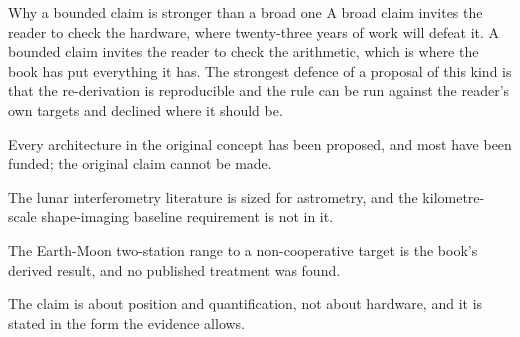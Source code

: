 \begin{seamnote}{Why a bounded claim is stronger than a broad one}
A broad claim invites the reader to check the hardware, where twenty-three
years of work will defeat it. A bounded claim invites the reader to check
the arithmetic, which is where the book has put everything it has. The
strongest defence of a proposal of this kind is that the re-derivation is
reproducible and the rule can be run against the reader's own targets and
declined where it should be.
\end{seamnote}

\begin{keytakeaways}
\item Every architecture in the original concept has been proposed, and most
have been funded; the original claim cannot be made.
\item The lunar interferometry literature is sized for astrometry, and the
kilometre-scale shape-imaging baseline requirement is not in it.
\item The Earth-Moon two-station range to a non-cooperative target is the
book's derived result, and no published treatment was found.
\item The claim is about position and quantification, not about hardware, and
it is stated in the form the evidence allows.
\end{keytakeaways}
